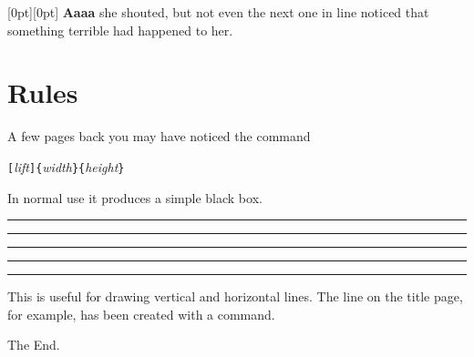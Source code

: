 \begin{example}[examplewidth=0.45\linewidth]
\raisebox{0pt}[0pt][0pt]{\Large%
\textbf{Aaaa%
%
%
%
}}
she shouted, but not even the next
one in line noticed that something
terrible had happened to her.
\end{example}

\section{Rules}\label{sec:rule}

A few pages back you may have noticed the command

\begin{lscommand}
  \verb|[|\emph{lift}\verb|]{|\emph{width}\verb|}{|\emph{height}\verb|}|
\end{lscommand}

\noindent In normal use it produces a simple black box.

\begin{example}
\rule{3mm}{.1pt}%
\rule[-1mm]{5mm}{1cm}%
\rule{3mm}{.1pt}%
\rule[1mm]{1cm}{5mm}%
\rule{3mm}{.1pt}
\end{example}

\noindent This is useful for drawing vertical and horizontal
lines. The line on the title page, for example, has been created with a
 command.

\bigskip
\begin{FlushRight}
  The End.
\end{FlushRight}

%

